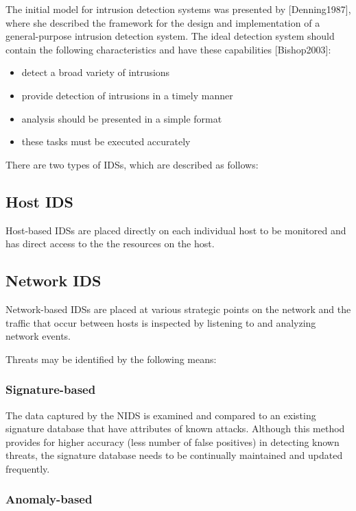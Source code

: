 \documentclass[12pt,]{article}
\begin{document}
The initial model for intrusion detection systems was presented by
{[}Denning1987{]}, where she described the framework for the design and
implementation of a general-purpose intrusion detection system. The
ideal detection system should contain the following characteristics and
have these capabilities {[}Bishop2003{]}:

\begin{itemize}
\itemsep1pt\parskip0pt
\item
  detect a broad variety of intrusions
\item
  provide detection of intrusions in a timely manner
\item
  analysis should be presented in a simple format
\item
  these tasks must be executed accurately
\end{itemize}

There are two types of IDSs, which are described as follows:

\subsection{Host IDS}\label{host-ids}

Host-based IDSs are placed directly on each individual host to be
monitored and has direct access to the the resources on the host.

\subsection{Network IDS}\label{network-ids}

Network-based IDSs are placed at various strategic points on the network
and the traffic that occur between hosts is inspected by listening to
and analyzing network events.

Threats may be identified by the following means:

\subsubsection{Signature-based}\label{signature-based}

The data captured by the NIDS is examined and compared to an existing
signature database that have attributes of known attacks. Although this
method provides for higher accuracy (less number of false positives) in
detecting known threats, the signature database needs to be continually
maintained and updated frequently.

\subsubsection{Anomaly-based}\label{anomaly-based}
\end{document}
